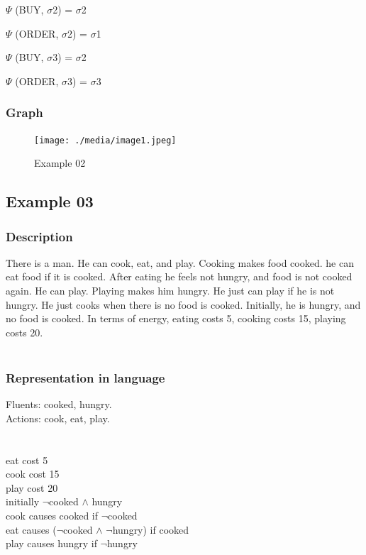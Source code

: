 \documentclass[11pt]{article}
\begin{document}
	\(  \Psi  \)  (BUY, $ \sigma $2) = $ \sigma $2\par
	
	\(  \Psi  \)  (ORDER, $ \sigma $2) = $ \sigma $1\par
	
	\(  \Psi  \)  (BUY, $ \sigma $3) = $ \sigma $2\par
	
	\(  \Psi  \)  (ORDER, $ \sigma $3) = $ \sigma $3\par
	\subsubsection{Graph}\label{par:p402}
	\begin{figure}[H]
		\texttt{[image: ./media/image1.jpeg]}
		\label{Figure:f02}
		\caption{Example 02}
	\end{figure}
	\subsection{Example 03}
	\subsubsection{Description}\label{par:p103}
	There is a man. He can cook, eat, and play. Cooking makes food cooked. he can eat food if it is cooked. After eating he feels not hungry, and food is not cooked again. He can play. Playing makes him hungry. He just can play if he is not hungry. He just cooks when there is no food is cooked. Initially, he is hungry, and no food is cooked. In terms of energy, eating costs 5, cooking costs 15, playing costs 20.\\
	\\
	\subsubsection{Representation in language}\label{par:p203}
	Fluents: cooked, hungry.\\
	Actions: cook, eat, play.\\
	\\
	\\
	eat cost 5\\
	cook cost 15\\
	play cost 20\\
	initially $\neg$cooked $\land$ hungry\\
	cook causes cooked if $\neg$cooked\\
	eat causes ($\neg$cooked $\land$ $\neg$hungry) if cooked\\
	play causes hungry if $\neg$hungry\\
	\\
\end{document}
